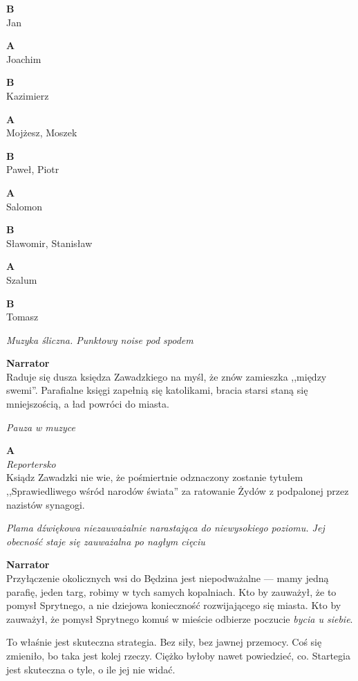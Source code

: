 \documentclass[11pt,a4paper,oneside]{article}
\begin{document}
\textbf{B}\\
Jan

\textbf{A}\\
Joachim

\textbf{B}\\
Kazimierz

\textbf{A}\\
Mojżesz,  Moszek

\textbf{B}\\
Paweł, Piotr

\textbf{A}\\
Salomon

\textbf{B}\\
Sławomir,  Stanisław

\textbf{A}\\
Szalum

\textbf{B}\\
Tomasz

{\color{light-gray} \emph{Muzyka śliczna. Punktowy noise pod spodem}}

\textbf{Narrator}\\
Raduje się dusza księdza Zawadzkiego na myśl, że znów zamieszka
,,między swemi''. Parafialne księgi zapełnią się katolikami, 
bracia starsi staną się mniejszością, a ład powróci do miasta.

{\color{light-gray} \emph{Pauza w muzyce}}

\textbf{A}\\
{\color{light-gray} \emph{Reportersko}}\\
Ksiądz Zawadzki nie wie, że pośmiertnie odznaczony zostanie tytułem
,,Sprawiedliwego wśród narodów świata'' za ratowanie Żydów
z podpalonej przez nazistów synagogi.

{\color{light-gray} \emph{Plama dźwiękowa niezauważalnie narastająca
do niewysokiego poziomu. Jej obecność staje się zauważalna po nagłym
cięciu}}

\textbf{Narrator}\\
Przyłączenie okolicznych wsi do Będzina jest niepodważalne --- mamy
jedną parafię, jeden targ, robimy w  tych samych kopalniach. Kto by
zauważył, że to pomysł Sprytnego, a nie dziejowa konieczność
rozwijającego się miasta.  Kto by zauważył, że pomysł Sprytnego komuś
w mieście odbierze poczucie \emph{bycia u siebie}.  

To właśnie jest skuteczna strategia. Bez siły, bez jawnej przemocy.
Coś się zmieniło, bo taka jest kolej rzeczy.  Ciężko byłoby nawet
powiedzieć, co. Startegia jest skuteczna o tyle, o ile jej nie widać. 
\end{document}
